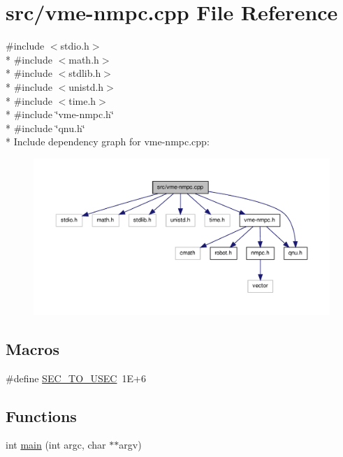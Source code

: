 \hypertarget{vme-nmpc_8cpp}{\section{src/vme-\/nmpc.cpp File Reference}
\label{vme-nmpc_8cpp}
}
{\ttfamily \#include $<$stdio.\-h$>$}\\*
{\ttfamily \#include $<$math.\-h$>$}\\*
{\ttfamily \#include $<$stdlib.\-h$>$}\\*
{\ttfamily \#include $<$unistd.\-h$>$}\\*
{\ttfamily \#include $<$time.\-h$>$}\\*
{\ttfamily \#include \char`\"{}vme-\/nmpc.\-h\char`\"{}}\\*
{\ttfamily \#include \char`\"{}qnu.\-h\char`\"{}}\\*
Include dependency graph for vme-\/nmpc.cpp\-:
\nopagebreak
\begin{figure}[H]
\begin{center}
\leavevmode
\includegraphics[width=350pt]{vme-nmpc_8cpp__incl}
\end{center}
\end{figure}
\subsection*{Macros}
\begin{DoxyCompactItemize}
\item 
\#define \hyperlink{vme-nmpc_8cpp_a3b04f7ae919ef7628774db8d24ee2c6d}{S\-E\-C\-\_\-\-T\-O\-\_\-\-U\-S\-E\-C}~1\-E+6
\end{DoxyCompactItemize}
\subsection*{Functions}
\begin{DoxyCompactItemize}
\item 
int \hyperlink{vme-nmpc_8cpp_a3c04138a5bfe5d72780bb7e82a18e627}{main} (int argc, char $\ast$$\ast$argv)
\end{DoxyCompactItemize}


